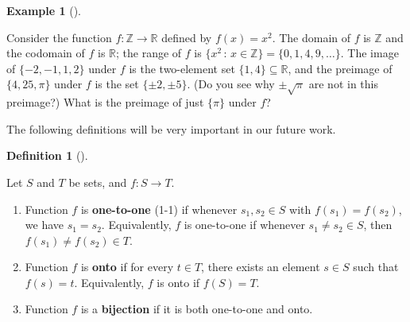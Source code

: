 \documentclass[10pt,]{book}
\newcommand{\terminology}[1]{\textbf{#1}}
\theoremstyle{plain}
\theoremstyle{definition}
\newtheorem{definition}[theorem]{Definition}
\theoremstyle{definition}
\theoremstyle{definition}
\newtheorem{example}[theorem]{Example}
\theoremstyle{definition}
\numberwithin{equation}{section}
\def\Z{\mathbb{Z}}
\def\R{\mathbb{R}}
\begin{document}
\begin{example}[]\label{example-5}

        Consider the function \(f: \Z \to \R\) defined by \(f(x)=x^2\).
        The domain of \(f\) is \(\Z\) and the codomain of \(f\) is \(\R\); the
        range of \(f\) is \(\{x^2\,:\,x\in \Z\}=\{0,1,4,9,\ldots\}\). The image
        of \(\{-2,-1,1,2\}\) under \(f\) is the two-element set \(\{1,4\} \subseteq
        \R\), and the preimage of \(\{4,25,\pi\}\) under \(f\) is the set
        \(\{\pm 2, \pm 5\}\). (Do you see why \(\pm \sqrt{\pi}\) are not in this
        preimage?) What is the preimage of just \(\{\pi\}\) under \(f\)?
\end{example}
\par

    The following definitions will be very important in our future work.
\begin{definition}[{}]\label{definition-9}

        Let \(S\) and \(T\) be sets, and \(f:S\to T\).
        \leavevmode%
\begin{enumerate}
\item\hypertarget{li-9}{}
              Function \(f\) is \terminology{one-to-one} (1-1) if whenever \(s_1, s_2\in S\) with \(f(s_1)=f(s_2)\), we have \(s_1=s_2\).  Equivalently, \(f\) is one-to-one if
              whenever \(s_1\neq s_2 \in S\), then \(f(s_1)\neq f(s_2) \in T\).
\item\hypertarget{li-10}{}
              Function \(f\) is \terminology{onto} if for every \(t\in T\), there exists an element \(s\in S\) such that \(f(s)=t\).  Equivalently, \(f\) is onto if \(f(S)=T\).
\item\hypertarget{li-11}{}
              Function \(f\) is a \terminology{bijection} if it is both one-to-one and onto.
\end{enumerate}

\end{definition}
\end{document}

